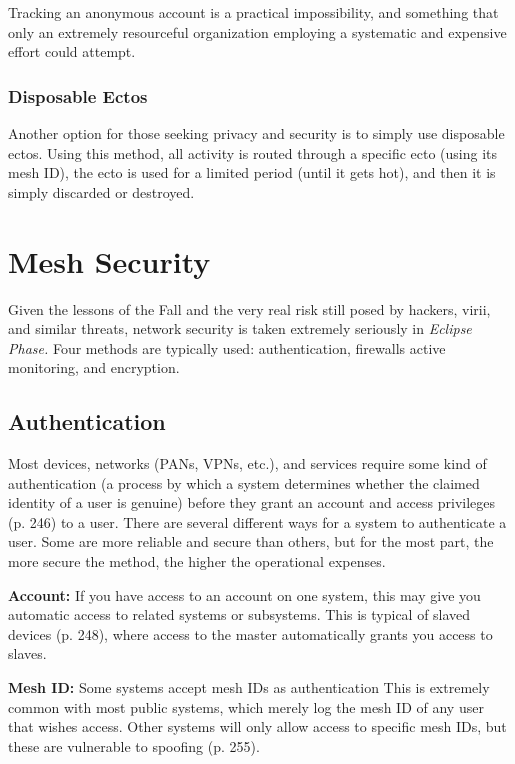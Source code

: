 Tracking an anonymous account is a practical 
impossibility, and something that only an extremely 
resourceful organization employing a systematic and 
expensive effort could attempt.

\subsubsection{Disposable Ectos}

Another option for those seeking privacy and security
is to simply use disposable ectos. Using this
method, all activity is routed through a specific ecto 
(using its mesh ID), the ecto is used for a limited 
period (until it gets hot), and then it is simply discarded
or destroyed.

\section{Mesh Security}

Given the lessons of the Fall and the very real risk still 
posed by hackers, virii, and similar threats, network 
security is taken extremely seriously in \textit{Eclipse Phase. }
Four methods are typically used: authentication, firewalls
active monitoring, and encryption.

\subsection{Authentication}

Most devices, networks (PANs, VPNs, etc.), and services
require some kind of authentication (a process
by which a system determines whether the claimed 
identity of a user is genuine) before they grant an account
and access privileges (p. 246) to a user. There
are several different ways for a system to authenticate 
a user. Some are more reliable and secure than others, 
but for the most part, the more secure the method, the 
higher the operational expenses.

\textbf{Account:} If you have access to an account on one 
system, this may give you automatic access to related 
systems or subsystems. This is typical of slaved devices 
(p. 248), where access to the master automatically 
grants you access to slaves.

\textbf{Mesh ID:} Some systems accept mesh IDs as authentication
This is extremely common with most public
systems, which merely log the mesh ID of any user 
that wishes access. Other systems will only allow 
access to specific mesh IDs, but these are vulnerable 
to spoofing (p. 255).

